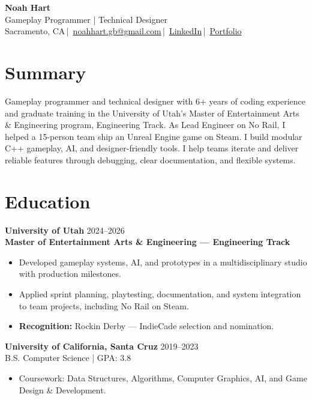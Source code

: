 \documentclass[10pt,letterpaper]{extarticle}
\begin{document}
\begin{center}
{\fontsize{18}{20}\selectfont\textbf{Noah Hart}}\\[2pt]
{\fontsize{11}{12}\selectfont Gameplay Programmer | Technical Designer}\\[4pt]
Sacramento, CA\,|\,
\href{mailto:noahhart.gb@gmail.com}{noahhart.gb@gmail.com}\,|\,
\href{https://www.linkedin.com/in/noah-hart-96124a260/}{LinkedIn}\,|\,
\href{https://nrhart.github.io/NoahsPortfolio/}{Portfolio}
\end{center}

\section*{Summary}
Gameplay programmer and technical designer with 6+ years of coding experience and graduate training in the University of Utah's Master of Entertainment Arts \& Engineering program, Engineering Track. As Lead Engineer on No Rail, I helped a 15-person team ship an Unreal Engine game on Steam. I build modular C++ gameplay, AI, and designer-friendly tools. I help teams iterate and deliver reliable features through debugging, clear documentation, and flexible systems.

\section*{Education}
\textbf{University of Utah} \hfill 2024--2026\\[-1pt]
\textbf{Master of Entertainment Arts \& Engineering --- Engineering Track}
\begin{itemize}
\item Developed gameplay systems, AI, and prototypes in a multidisciplinary studio with production milestones.
\item Applied sprint planning, playtesting, documentation, and system integration to team projects, including No Rail on Steam.
\item \textbf{Recognition:} Rockin Derby --- IndieCade selection and nomination.
\end{itemize}
\vspace{2.15pt}
\textbf{University of California, Santa Cruz} \hfill 2019--2023\\[-1pt]
B.S. Computer Science | GPA: 3.8
\begin{itemize}
\item Coursework: Data Structures, Algorithms, Computer Graphics, AI, and Game Design \& Development.
\end{itemize}
\end{document}
